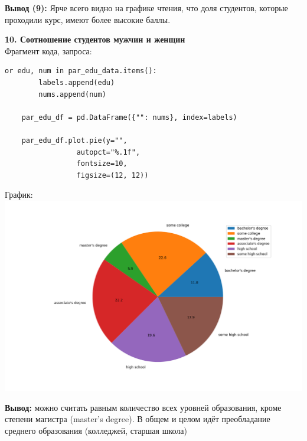 \documentclass[12pt,a4paper]{article}
\begin{document}
\large \textbf{Вывод (9):} Ярче всего видно на графике чтения, что доля студентов, которые проходили курс, имеют более высокие баллы.
 
 
\textbf{10. Соотношение студентов мужчин и женщин}\\
Фрагмент кода, запроса:
\begin{verbatim}
or edu, num in par_edu_data.items():
        labels.append(edu)
        nums.append(num)

    par_edu_df = pd.DataFrame({"": nums}, index=labels)

    par_edu_df.plot.pie(y="",
                 autopct="%.1f",
                 fontsize=10,
                 figsize=(12, 12))
\end{verbatim}


График: \\

\includegraphics[scale=0.5]{parental_edu.png} 

\large \textbf{Вывод:} можно считать равным количество всех уровней образования, кроме степени магистра (master's degree). В общем и целом идёт преобладание среднего образования (колледжей, старшая школа)
\end{document}
